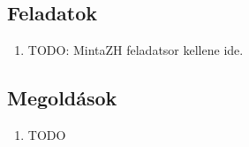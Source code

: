 \documentclass[fleqn]{szb-practice}
\begin{document}
\clearpage
\subsection{Feladatok}

\begin{enumerate}
  \item TODO: MintaZH feladatsor kellene ide.
\end{enumerate}

\clearpage
\subsection{Megoldások}

\begin{enumerate}
  \item TODO
\end{enumerate}
\end{document}
